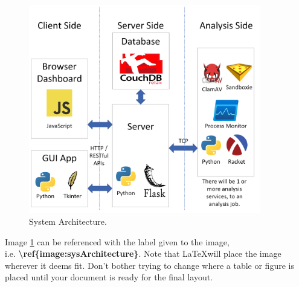 \begin{figure}[h!]
    \includegraphics[width=0.9\textwidth]{images/architecture.png}
    \caption{System Architecture.}
    \label{image:sysArchitecture}
\end{figure}

Image \ref{image:sysArchitecture} can be referenced with the label given to the image, \\ i.e. \textbf{\textbackslash{}ref\{image:sysArchitecture\}}. Note that \LaTeX will place the image wherever it deems fit. Don't bother trying to change where a table or figure is placed until your document is ready for the final layout.
